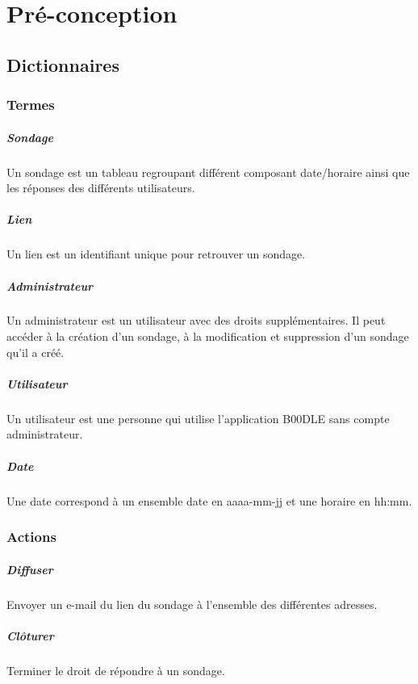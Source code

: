 \documentclass[]{report}
\begin{document}
\chapter{Pré-conception}

\section{Dictionnaires}
\subsection{Termes}
\paragraph{Sondage} Un sondage est un tableau regroupant différent composant date/horaire ainsi que les réponses des différents utilisateurs.
\paragraph{Lien} Un lien est un identifiant unique pour retrouver un sondage.
\paragraph{Administrateur} Un administrateur est un utilisateur avec des droits supplémentaires. Il peut accéder à la création d’un sondage, à la modification et suppression d’un sondage qu’il a créé.
\paragraph{Utilisateur} Un utilisateur est une personne qui utilise l’application B00DLE sans compte administrateur.
\paragraph{Date} Une date correspond à un ensemble date en aaaa-mm-jj et une horaire en hh:mm.

\subsection{Actions}
\paragraph{Diffuser} Envoyer un e-mail du lien du sondage à l’ensemble des différentes adresses.
\paragraph{Clôturer} Terminer le droit de répondre à un sondage.
\end{document}
